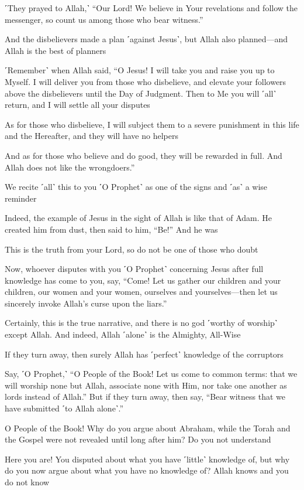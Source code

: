 ˹They prayed to Allah,˺ “Our Lord! We believe in Your revelations and follow the messenger, so count us among those who bear witness.”

And the disbelievers made a plan ˹against Jesus˺, but Allah also planned—and Allah is the best of planners

˹Remember˺ when Allah said, “O Jesus! I will take you and raise you up to Myself. I will deliver you from those who disbelieve, and elevate your followers above the disbelievers until the Day of Judgment. Then to Me you will ˹all˺ return, and I will settle all your disputes

As for those who disbelieve, I will subject them to a severe punishment in this life and the Hereafter, and they will have no helpers

And as for those who believe and do good, they will be rewarded in full. And Allah does not like the wrongdoers.”

We recite ˹all˺ this to you ˹O Prophet˺ as one of the signs and ˹as˺ a wise reminder

Indeed, the example of Jesus in the sight of Allah is like that of Adam. He created him from dust, then said to him, “Be!” And he was

This is the truth from your Lord, so do not be one of those who doubt

Now, whoever disputes with you ˹O Prophet˺ concerning Jesus after full knowledge has come to you, say, “Come! Let us gather our children and your children, our women and your women, ourselves and yourselves—then let us sincerely invoke Allah’s curse upon the liars.”

Certainly, this is the true narrative, and there is no god ˹worthy of worship˺ except Allah. And indeed, Allah ˹alone˺ is the Almighty, All-Wise

If they turn away, then surely Allah has ˹perfect˺ knowledge of the corruptors

Say, ˹O Prophet,˺ “O People of the Book! Let us come to common terms: that we will worship none but Allah, associate none with Him, nor take one another as lords instead of Allah.” But if they turn away, then say, “Bear witness that we have submitted ˹to Allah alone˺.”

O People of the Book! Why do you argue about Abraham, while the Torah and the Gospel were not revealed until long after him? Do you not understand

Here you are! You disputed about what you have ˹little˺ knowledge of, but why do you now argue about what you have no knowledge of? Allah knows and you do not know


